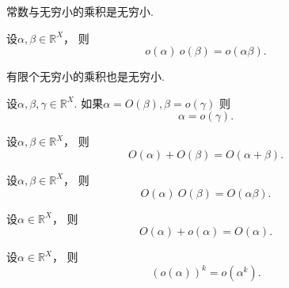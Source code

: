 \begin{corollary}
常数与无穷小的乘积是无穷小.
\end{corollary}

\begin{proposition}
设\(\alpha,\beta\in\mathbb{R}^X\)，
则\begin{equation*}
	o(\alpha)~o(\beta) = o(\alpha \beta).
\end{equation*}
\end{proposition}
\begin{corollary}
有限个无穷小的乘积也是无穷小.
\end{corollary}

\begin{proposition}
设\(\alpha,\beta,\gamma\in\mathbb{R}^X\).
如果\(\alpha = O(\beta),
\beta = o(\gamma)\)
则\begin{equation*}
	\alpha = o(\gamma).
\end{equation*}
\end{proposition}
\begin{proposition}
设\(\alpha,\beta\in\mathbb{R}^X\)，
则\begin{equation*}
	O(\alpha) + O(\beta) = O(\alpha + \beta).
\end{equation*}
\end{proposition}
\begin{proposition}
设\(\alpha,\beta\in\mathbb{R}^X\)，
则\begin{equation*}
	O(\alpha)~O(\beta) = O(\alpha \beta).
\end{equation*}
\end{proposition}
\begin{proposition}
设\(\alpha\in\mathbb{R}^X\)，
则\begin{equation*}
	O(\alpha) + o(\alpha) = O(\alpha).
\end{equation*}
\end{proposition}
\begin{proposition}
设\(\alpha\in\mathbb{R}^X\)，
则\begin{equation*}
	(o(\alpha))^k = o(\alpha^k).
\end{equation*}
\end{proposition}

